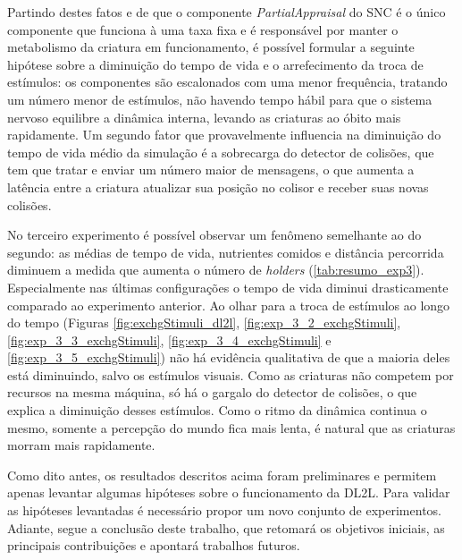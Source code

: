 Partindo destes fatos e de que o componente \textit{PartialAppraisal} do SNC é o único componente que funciona à uma taxa fixa e é responsável por manter o metabolismo da criatura em funcionamento, é possível formular a seguinte hipótese sobre a diminuição do tempo de vida e o arrefecimento da troca de estímulos: os componentes são escalonados com uma menor frequência, tratando um número menor de estímulos, não havendo tempo hábil para que o sistema nervoso equilibre a dinâmica interna, levando as criaturas ao óbito mais rapidamente. Um segundo fator que provavelmente influencia na diminuição do tempo de vida médio da simulação é a sobrecarga do detector de colisões, que tem que tratar e enviar um número maior de mensagens, o que aumenta a latência entre a criatura atualizar sua posição no colisor e receber suas novas colisões.

No terceiro experimento é possível observar um fenômeno semelhante ao do segundo: as médias de tempo de vida, nutrientes comidos e distância percorrida diminuem a medida que aumenta o número de \textit{holders} (\autoref{tab:resumo_exp3}). Especialmente nas últimas configurações o tempo de vida diminui drasticamente comparado ao experimento anterior. Ao olhar para a troca de estímulos ao longo do tempo (Figuras \ref{fig:exchgStimuli_dl2l}, \ref{fig:exp_3_2_exchgStimuli}, \ref{fig:exp_3_3_exchgStimuli}, \ref{fig:exp_3_4_exchgStimuli} e \ref{fig:exp_3_5_exchgStimuli}) não há evidência qualitativa de que a maioria deles está diminuindo, salvo os estímulos visuais. Como as criaturas não competem por recursos na mesma máquina, só há o gargalo do detector de colisões, o que explica a diminuição desses estímulos. Como o ritmo da dinâmica continua o mesmo, somente a percepção do mundo fica mais lenta, é natural que as criaturas morram mais rapidamente.

Como dito antes, os resultados descritos acima foram preliminares e permitem apenas levantar algumas hipóteses sobre o funcionamento da DL2L. Para validar as hipóteses levantadas é necessário propor um novo conjunto de experimentos. Adiante, segue a conclusão deste trabalho, que retomará os objetivos iniciais, as principais contribuições e apontará trabalhos futuros.

